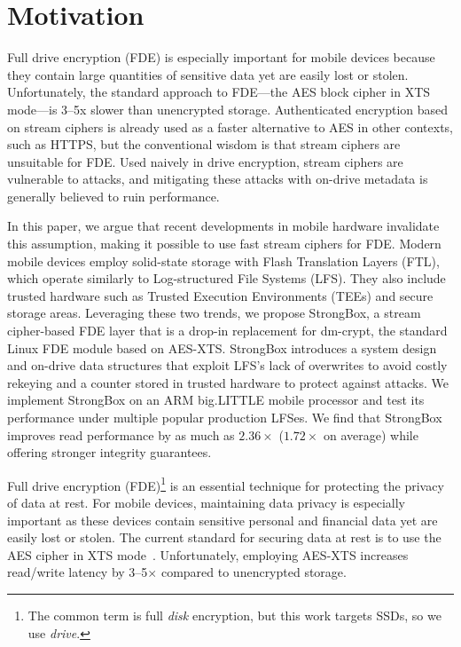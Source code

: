 \section{Motivation} \label{sec:sb-motivation}

Full drive encryption (FDE) is especially important for mobile devices because
they contain large quantities of sensitive data yet are easily lost or stolen.
Unfortunately, the standard approach to FDE---the AES block cipher in XTS
mode---is 3--5x slower than unencrypted storage. Authenticated encryption based on
stream ciphers is already used as a faster alternative to AES in other contexts,
such as HTTPS, but the conventional wisdom is that stream ciphers are unsuitable
for FDE. Used naively in drive encryption, stream ciphers are vulnerable to
attacks, and mitigating these attacks with on-drive metadata is generally
believed to ruin performance.

In this paper, we argue that recent developments in mobile hardware invalidate
this assumption, making it possible to use fast stream ciphers for FDE. Modern
mobile devices employ solid-state storage with Flash Translation Layers (FTL),
which operate similarly to Log-structured File Systems (LFS). They also include
trusted hardware such as Trusted Execution Environments (TEEs) and secure
storage areas. Leveraging these two trends, we propose StrongBox, a stream
cipher-based FDE layer that is a drop-in replacement for dm-crypt, the standard
Linux FDE module based on AES-XTS. StrongBox introduces a system design and
on-drive data structures that exploit LFS's lack of overwrites to avoid costly
rekeying and a counter stored in trusted hardware to protect against attacks. We
implement StrongBox on an ARM big.LITTLE mobile processor and test its
performance under multiple popular production LFSes. We find that StrongBox
improves read performance by as much as $2.36\times$ ($1.72\times$ on average)
while offering stronger integrity guarantees.

Full drive encryption (FDE)\footnote{The common term is full \emph{disk}
encryption, but this work targets SSDs, so we use \emph{drive}.} is an essential
technique for protecting the privacy of data at rest. For mobile devices,
maintaining data privacy is especially important as these devices contain
sensitive personal and financial data yet are easily lost or stolen. The current
standard for securing data at rest is to use the AES cipher in XTS
mode~\cite{XTS, NISTXTS}. Unfortunately, employing AES-XTS increases read/write
latency by 3--5$\times$ compared to unencrypted storage.

